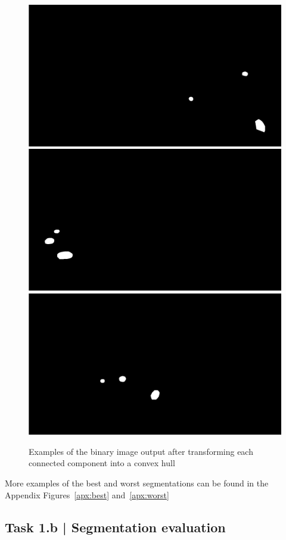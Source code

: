 \documentclass[conference]{IEEEtran}
\begin{document}
        \begin{figure}[htbp]
            \centering
            \includegraphics[width=0.49\columnwidth]{figures/final_mask.png}
            \includegraphics[width=0.49\columnwidth]{figures/final_mask2.png}
            \includegraphics[width=0.49\columnwidth]{figures/final_mask3.png}
            \caption{Examples of the binary image output after transforming each connected component into a convex hull~\label{fig:final}}
        \end{figure}

        More examples of the best and worst segmentations can be found in the Appendix Figures~\ref{apx:best} and~\ref{apx:worst}


    \subsection*{Task 1.b | Segmentation evaluation}
\end{document}
